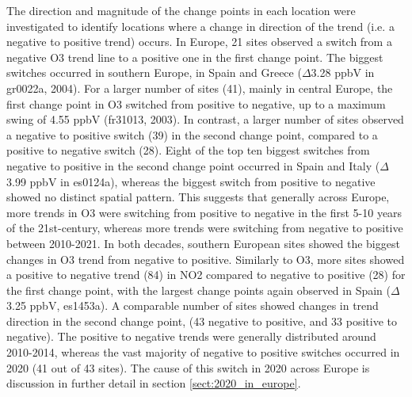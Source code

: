 \documentclass[journal abbreviation, manuscript]{copernicus}
\begin{document}
The direction and magnitude of the change points in each location were investigated to identify locations where a change in direction of the trend (i.e. a negative to positive trend) occurs. In Europe, 21 sites observed a switch from a negative O3 trend line to a positive one in the first change point. The biggest switches occurred in southern Europe, in Spain and Greece ($\Delta$3.28 ppbV in gr0022a, 2004). For a larger number of sites (41), mainly in central Europe, the first change point in O3 switched from positive to negative, up to a maximum swing of 4.55 ppbV (fr31013, 2003). In contrast, a larger number of sites observed a negative to positive switch (39) in the second change point, compared to a positive to negative switch (28). Eight of the top ten biggest switches from negative to positive in the second change point occurred in Spain and Italy ($\Delta$3.99 ppbV in es0124a), whereas the biggest switch from positive to negative showed no distinct spatial pattern. This suggests that generally across Europe, more trends in O3 were switching from positive to negative in the first 5-10 years of the 21st-century, whereas more trends were switching from negative to positive between 2010-2021. In both decades, southern European sites showed the biggest changes in O3 trend from negative to positive.
Similarly to O3, more sites showed a positive to negative trend (84) in NO2 compared to negative to positive (28) for the first change point, with the largest change points again observed in Spain ($\Delta$3.25 ppbV, es1453a). A comparable number of sites showed changes in trend direction in the second change point, (43 negative to positive, and 33 positive to negative). The positive to negative trends were generally distributed around 2010-2014, whereas the vast majority of negative to positive switches occurred in 2020 (41 out of 43 sites). The cause of this switch in 2020 across Europe is discussion in further detail in section \ref{sect:2020_in_europe}.
\end{document}
